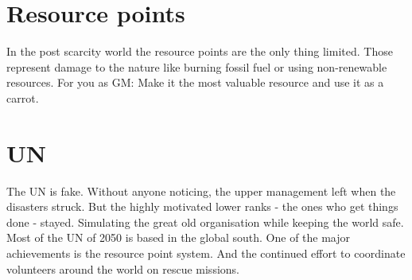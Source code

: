 \section{Resource points}
\label{sec:Resource Points}
In the post scarcity world the resource points are the only thing limited. Those represent damage to the nature like burning fossil fuel or using non-renewable resources. For you as GM: Make it the most valuable resource and use it as a carrot.

\section{UN}
\label{sec:UN}
The UN is fake. Without anyone noticing, the upper management left when the disasters struck. But the highly motivated lower ranks - the ones who get things done - stayed. Simulating the great old organisation while keeping the world safe. Most of the UN of 2050 is based in the global south. One of the major achievements is the resource point system. And the continued effort to coordinate volunteers around the world on rescue missions.
